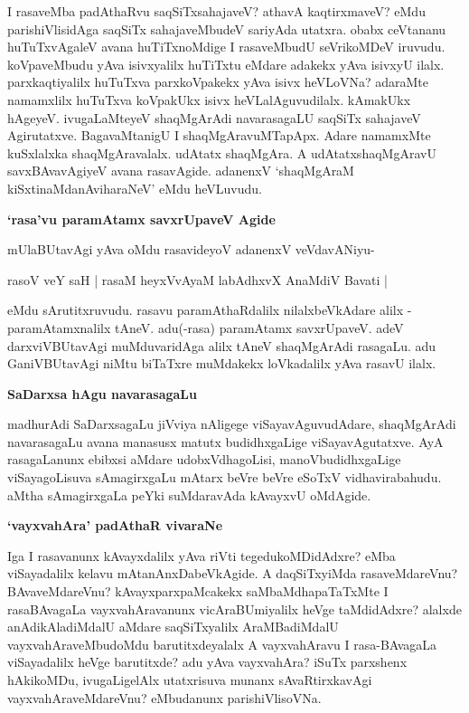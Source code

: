 \noindent
I rasaveMba padAthaRvu saqSiTxsahajaveV? athavA kaqtirxmaveV? eMdu parishiVlisidAga saqSiTx sahajaveMbudeV sariyAda utatxra. obabx ceVtananu huTuTxvAgaleV avana huTiTxnoMdige I rasaveMbudU seVrikoMDeV iruvudu. koVpaveMbudu yAva isivxyalilx huTiTxtu eMdare adakekx yAva isivxyU ilalx. parxkaqtiyalilx huTuTxva parxkoVpakekx yAva isivx heVLoVNa? adaraMte namamxlilx huTuTxva koVpakUkx isivx heVLalAguvudilalx. kAmakUkx hAgeyeV. ivugaLaMteyeV shaqMgArAdi navarasagaLU saqSiTx sahajaveV Agirutatxve. BagavaMtanigU I shaqMgAravuMTapApx. Adare namamxMte kuSxlalxka shaqMgAravalalx. udAtatx shaqMgAra. A udAtatxshaqMgAravU savxBAvavAgiyeV avana rasavAgide. adanenxV `shaqMgAraM kiSxtinaMdanAviharaNeV' eMdu heVLuvudu.

{\bigskip
\noindent
{\large\bf `rasa'vu paramAtamx savxrUpaveV Agide}}\label{page222b}
\medskip

\noindent
mUlaBUtavAgi yAva oMdu rasavideyoV adanenxV veVdavANiyu-

\begin{shloka}
rasoV veY saH | rasaM heyxVvAyaM labAdhxvX AnaMdiV Bavati |
\end{shloka}

\noindent
eMdu sArutitxruvudu. rasavu paramAthaRdalilx nilalxbeVkAdare alilx - paramAtamxnalilx tAneV. adu(-rasa) paramAtamx savxrUpaveV. adeV darxviVBUtavAgi muMduvaridAga alilx tAneV shaqMgArAdi rasagaLu. adu GaniVBUtavAgi niMtu biTaTxre muMdakekx loVkadalilx yAva rasavU ilalx.

{\bigskip
\noindent
{\large\bf SaDarxsa hAgu navarasagaLu}}\label{page223}
\medskip

\noindent
madhurAdi SaDarxsagaLu jiVviya nAligege viSayavAguvudAdare, shaqMgArAdi navarasagaLu avana manasusx matutx budidhxgaLige viSayavAgutatxve. AyA rasagaLanunx ebibxsi aMdare udobxVdhagoLisi, manoVbudidhxgaLige viSayagoLisuva sAmagirxgaLu mAtarx beVre beVre eSoTxV vidhavirabahudu. aMtha sAmagirxgaLa peYki suMdaravAda kAvayxvU oMdAgide. 

{\bigskip
\noindent
{\large\bf `vayxvahAra' padAthaR vivaraNe}}\label{page223a}
\medskip

\noindent
Iga I rasavanunx kAvayxdalilx yAva riVti tegedukoMDidAdxre? eMba viSayadalilx kelavu mAtanAnxDabeVkAgide. A daqSiTxyiMda rasaveMdareVnu? BAvaveMdareVnu? kAvayxparxpaMcakekx saMbaMdhapaTaTxMte I rasaBAvagaLa vayxvahAravanunx vicAraBUmiyalilx heVge taMdidAdxre? alalxde anAdikAladiMdalU aMdare saqSiTxyalilx AraMBadiMdalU vayxvahAraveMbudoMdu barutitxdeyalalx A vayxvahAravu I rasa-BAvagaLa viSayadalilx heVge barutitxde? adu yAva vayxvahAra? iSuTx parxshenx hAkikoMDu, ivugaLigelAlx utatxrisuva munanx sAvaRtirxkavAgi vayxvahAraveMdareVnu? eMbudanunx parishiVlisoVNa.

